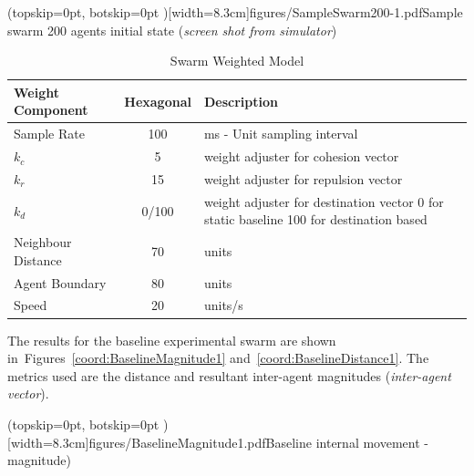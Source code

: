 \documentclass{ieeeaccess}
\begin{document}

\Figure[t!](topskip=0pt, botskip=0pt )[width=8.3cm]{figures/SampleSwarm200-1.pdf}{Sample swarm 200 agents initial state (\textit{screen shot from simulator})\label{fig:SampleSwarm200-1}}

\begin{table}
\begin{center}
\begin{tabular}{| p{1.5cm} | c | p{3.5cm} |}
\hline
\bf Weight \bf Component & \bf Hexagonal & \bf Description \\ \hline
Sample Rate & 100 & ms - Unit sampling interval\\  \hline
$k_c$ & 5 & weight adjuster for cohesion vector\\  \hline
$k_r$ & 15 & weight adjuster for repulsion  vector\\  \hline
$k_d$ & 0/100 & weight adjuster for destination vector 0 for static baseline 100 for destination based\\  \hline
Neighbour Distance & 70 & units\\  \hline
Agent Boundary & 80 & units\\  \hline
Speed & 20 & units/s\\  \hline
\end{tabular}\caption{Swarm Weighted Model} \label{tab:DynamicPhysics1}
\end{center}
\end{table}

The results for the baseline experimental swarm are shown in~Figures~\ref{coord:BaselineMagnitude1} and~\ref{coord:BaselineDistance1}. The metrics used are the distance \cite{NIM:09} and resultant inter-agent magnitudes (\textit{inter-agent vector}).


\Figure[t!](topskip=0pt, botskip=0pt )[width=8.3cm]{figures/BaselineMagnitude1.pdf}{Baseline internal movement - magnitude)\label{coord:BaselineMagnitude1}}
\end{document}
